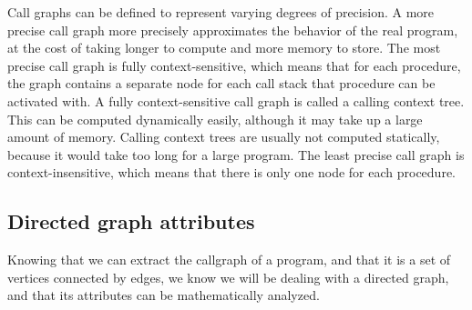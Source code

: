 Call graphs can be defined to represent varying degrees of precision. A more precise call graph more precisely approximates the behavior of the real program, at the cost of taking longer to compute and more memory to store. The most precise call graph is fully context-sensitive, which means that for each procedure, the graph contains a separate node for each call stack that procedure can be activated with. A fully context-sensitive call graph is called a calling context tree. This can be computed dynamically easily, although it may take up a large amount of memory. Calling context trees are usually not computed statically, because it would take too long for a large program. The least precise call graph is context-insensitive, which means that there is only one node for each procedure.

\subsection{Directed graph attributes}

Knowing that we can extract the callgraph of a program, and that it is a set of vertices connected by edges, we know we will be dealing with a directed graph, and that its attributes can be mathematically analyzed.\parencite{graphs} 

